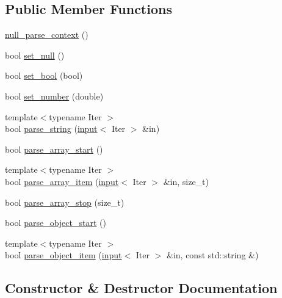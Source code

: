 \subsection*{Public Member Functions}
\begin{DoxyCompactItemize}
\item 
\hyperlink{classpicojson_1_1null__parse__context_a6dfac8641478f0d861ff8d5f063984ef}{null\+\_\+parse\+\_\+context} ()
\item 
bool \hyperlink{classpicojson_1_1null__parse__context_ad142ddadd513e41324f8d0515a19df2c}{set\+\_\+null} ()
\item 
bool \hyperlink{classpicojson_1_1null__parse__context_aa77397f08cf7859fabc04e9e4460b93a}{set\+\_\+bool} (bool)
\item 
bool \hyperlink{classpicojson_1_1null__parse__context_aeb8326108d42615b1b04cf82d510040c}{set\+\_\+number} (double)
\item 
{\footnotesize template$<$typename Iter $>$ }\\bool \hyperlink{classpicojson_1_1null__parse__context_aab2c7dee1eb5b477370832811cd40d14}{parse\+\_\+string} (\hyperlink{classpicojson_1_1input}{input}$<$ Iter $>$ \&in)
\item 
bool \hyperlink{classpicojson_1_1null__parse__context_ae78f8991e157a85b7ce0fb36f9a5f628}{parse\+\_\+array\+\_\+start} ()
\item 
{\footnotesize template$<$typename Iter $>$ }\\bool \hyperlink{classpicojson_1_1null__parse__context_a6623f92117dd6dc7bca60e9e9463a1a0}{parse\+\_\+array\+\_\+item} (\hyperlink{classpicojson_1_1input}{input}$<$ Iter $>$ \&in, size\+\_\+t)
\item 
bool \hyperlink{classpicojson_1_1null__parse__context_a8a763b600c17c5db42aee9afb2d2551d}{parse\+\_\+array\+\_\+stop} (size\+\_\+t)
\item 
bool \hyperlink{classpicojson_1_1null__parse__context_a95c208456592c33d53548fa88b831c7c}{parse\+\_\+object\+\_\+start} ()
\item 
{\footnotesize template$<$typename Iter $>$ }\\bool \hyperlink{classpicojson_1_1null__parse__context_a97c4b81a984ea473fe56e09aed7b9ca6}{parse\+\_\+object\+\_\+item} (\hyperlink{classpicojson_1_1input}{input}$<$ Iter $>$ \&in, const std\+::string \&)
\end{DoxyCompactItemize}


\subsection{Constructor \& Destructor Documentation}
\hypertarget{classpicojson_1_1null__parse__context_a6dfac8641478f0d861ff8d5f063984ef}{}\label{classpicojson_1_1null__parse__context_a6dfac8641478f0d861ff8d5f063984ef} 
